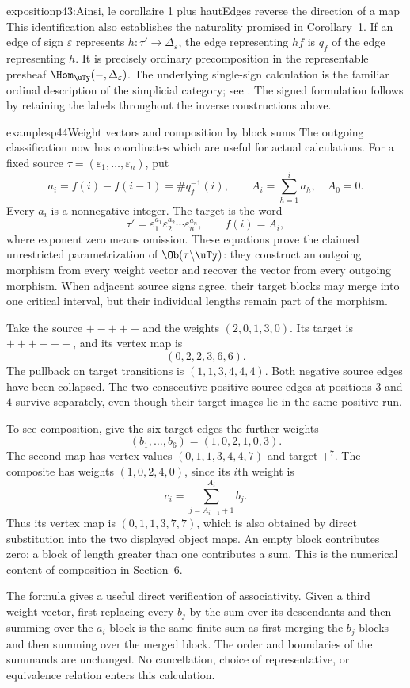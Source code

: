 \begin{dcomment}{exposition}{p43:Ainsi, le corollaire 1 plus haut}{Edges reverse the direction of a map}
This identification also establishes the naturality promised in Corollary~1. If an edge of sign $\varepsilon$ represents $h:\tau'\to\Delta_\varepsilon$, the edge representing $hf$ is $q_f$ of the edge representing $h$. It is precisely ordinary precomposition in the representable presheaf $\Hom_{\uTy}(-,\Delta_\varepsilon)$. The underlying single-sign calculation is the familiar ordinal description of the simplicial category; see \citet[Appendix~D.1, pp.~713--715]{AguiarMahajan2010}. The signed formulation follows by retaining the labels throughout the inverse constructions above.
\end{dcomment}

\begin{dcomment}{examples}{p44}{Weight vectors and composition by block sums}
The outgoing classification now has coordinates which are useful for actual calculations. For a fixed source $\tau=(\varepsilon_1,\ldots,\varepsilon_n)$, put
\[
 a_i=f(i)-f(i-1)=\#q_f^{-1}(i),\qquad
 A_i=\sum_{h=1}^{i}a_h,\quad A_0=0.
\]
Every $a_i$ is a nonnegative integer. The target is the word
\[
 \tau'=\varepsilon_1^{a_1}\varepsilon_2^{a_2}\cdots\varepsilon_n^{a_n},
 \qquad f(i)=A_i,
\]
where exponent zero means omission. These equations prove the claimed unrestricted parametrization of $\Ob(\tau\backslash\uTy)$: they construct an outgoing morphism from every weight vector and recover the vector from every outgoing morphism. When adjacent source signs agree, their target blocks may merge into one critical interval, but their individual lengths remain part of the morphism.

Take the source $+-++-$ and the weights $(2,0,1,3,0)$. Its target is $++++++$, and its vertex map is
\[
 (0,2,2,3,6,6).
\]
The pullback on target transitions is $(1,1,3,4,4,4)$. Both negative source edges have been collapsed. The two consecutive positive source edges at positions $3$ and $4$ survive separately, even though their target images lie in the same positive run.

To see composition, give the six target edges the further weights
\[
 (b_1,\ldots,b_6)=(1,0,2,1,0,3).
\]
The second map has vertex values $(0,1,1,3,4,4,7)$ and target $+^7$. The composite has weights $(1,0,2,4,0)$, since its $i$th weight is
\[
 c_i=\sum_{j=A_{i-1}+1}^{A_i}b_j.
\]
Thus its vertex map is $(0,1,1,3,7,7)$, which is also obtained by direct substitution into the two displayed object maps. An empty block contributes zero; a block of length greater than one contributes a sum. This is the numerical content of composition in Section~6.

The formula gives a useful direct verification of associativity. Given a third weight vector, first replacing every $b_j$ by the sum over its descendants and then summing over the $a_i$-block is the same finite sum as first merging the $b_j$-blocks and then summing over the merged block. The order and boundaries of the summands are unchanged. No cancellation, choice of representative, or equivalence relation enters this calculation.
\end{dcomment}

